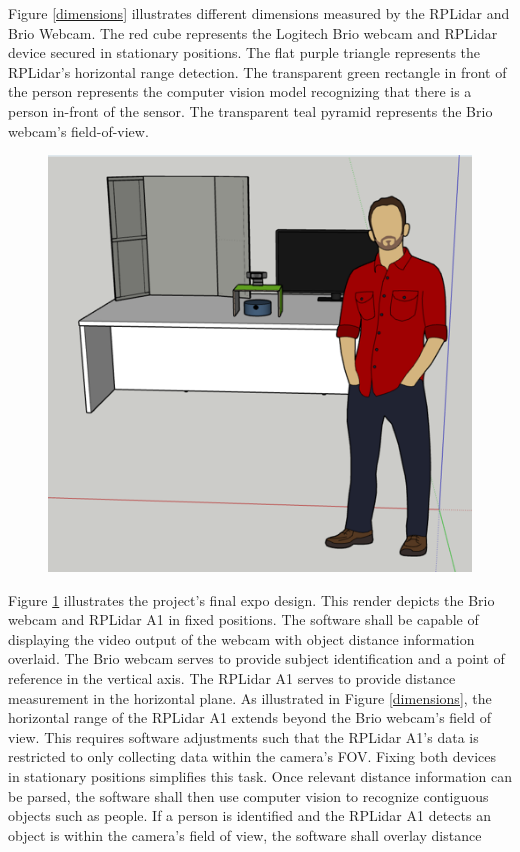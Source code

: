 \documentclass[onecolumn, draftclsnofoot,10pt, compsoc]{IEEEtran}
\begin{document}
\begin{singlespace}
			Figure \ref{dimensions} illustrates different dimensions measured by the RPLidar and Brio Webcam.
			The red cube represents the Logitech Brio webcam and RPLidar device secured in stationary positions.
			The flat purple triangle represents the RPLidar's horizontal range detection.
			The transparent green rectangle in front of the person represents the computer vision model recognizing that there is a person in-front of the sensor.
			The transparent teal pyramid represents the Brio webcam's field-of-view.
			
			\begin{figure}[here]
				\includegraphics[scale=0.55]{expo.PNG}
				\label{expo}
			\end{figure}

			Figure \ref{expo} illustrates the project's final expo design.
			This render depicts the Brio webcam and RPLidar A1 in fixed positions.
			The software shall be capable of displaying the video output of the webcam with object distance information overlaid.
			The Brio webcam serves to provide subject identification and a point of reference in the vertical axis.
			The RPLidar A1 serves to provide distance measurement in the horizontal plane.
			As illustrated in Figure \ref{dimensions}, the horizontal range of the RPLidar A1 extends beyond the Brio webcam's field of view.
			This requires software adjustments such that the RPLidar A1's data is restricted to only collecting data within the camera's FOV.
			Fixing both devices in stationary positions simplifies this task.
			Once relevant distance information can be parsed, the software shall then use computer vision to recognize contiguous objects such as people.
			If a person is identified and the RPLidar A1 detects an object is within the camera's field of view, the software shall overlay distance 


\end{singlespace}
\end{document}
